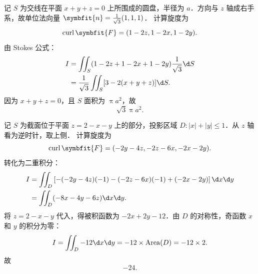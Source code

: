 \begin{solution}
    记 $S$ 为交线在平面 $x+y+z=0$ 上所围成的圆盘，半径为 $a$．方向与 $z$ 轴成右手系，故单位法向量 $\symbfit{n} = \frac{1}{\sqrt{3}}(1, 1, 1)$．
    计算旋度为
    \begin{equation}
        \label{eq:curl-5}
        \operatorname{curl} \symbfit{F} = (1-2z, 1-2x, 1-2y).
    \end{equation}
    由 Stokes 公式：
    \begin{equation}
        \label{eq:stokes-5}
        \begin{aligned}
            I & = \iint_S (1-2z+1-2x+1-2y) \frac{1}{\sqrt{3}} \d S \\
              & = \frac{1}{\sqrt{3}} \iint_S [3 - 2(x+y+z)] \d S.
        \end{aligned}
    \end{equation}
    因为 $x+y+z=0$，且 $S$ 面积为 $\uppi a^2$，故
    \begin{equation}
        \label{eq:res-5}
        \boxed{\sqrt{3}\uppi a^2}.
    \end{equation}


    记 $S$ 为截面位于平面 $z = 2-x-y$ 上的部分，投影区域 $D \colon |x|+|y| \leqslant 1$．从 $z$ 轴看为逆时针，取上侧．
    计算旋度为
    \begin{equation}
        \label{eq:curl-6}
        \operatorname{curl} \symbfit{F} = (-2y-4z, -2z-6x, -2x-2y).
    \end{equation}
    转化为二重积分：
    \begin{equation}
        \label{eq:stokes-6}
        \begin{aligned}
            I & = \iint_D \left[ -(-2y-4z)(-1) - (-2z-6x)(-1) + (-2x-2y) \right] \d x \d y \\
              & = \iint_D (-8x - 4y - 6z) \d x \d y.
        \end{aligned}
    \end{equation}
    将 $z = 2-x-y$ 代入，得被积函数为 $-2x + 2y - 12$．由 $D$ 的对称性，奇函数 $x$ 和 $y$ 的积分为零：
    \begin{equation}
        \label{eq:stokes-6-eval}
        I = \iint_D -12 \d x \d y = -12 \times \operatorname{Area}(D) = -12 \times 2.
    \end{equation}
    故
    \begin{equation}
        \label{eq:res-6}
        \boxed{-24}.
    \end{equation}
\end{solution}


